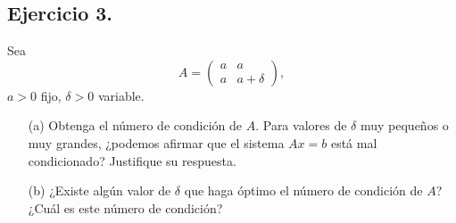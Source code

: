 
\subsection*{Ejercicio 3.}
Sea
\[
A =
\begin{pmatrix}
a & a \\
a & a + \delta
\end{pmatrix},
\]
$a > 0$ fijo, $\delta > 0$ variable.

\begin{enumerate}
    \item[(a)] Obtenga el número de condición de $A$. Para valores de $\delta$ muy pequeños o muy grandes, ¿podemos afirmar que el sistema $Ax = b$ está mal condicionado? Justifique su respuesta.
    \item[(b)] ¿Existe algún valor de $\delta$ que haga óptimo el número de condición de $A$? ¿Cuál es este número de condición?
\end{enumerate}